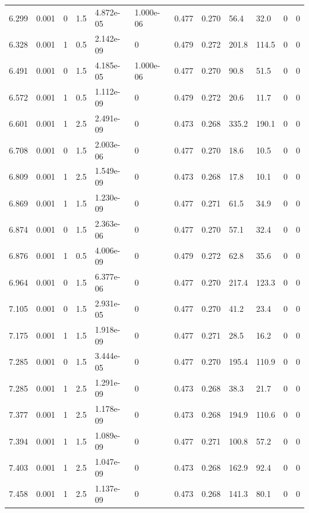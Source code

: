\documentclass[preview]{standalone}
\begin{document}
{{{\begin{tabular}{L{1.2cm}C{1.2cm} C{0.3cm}C{0.5cm} C{1.4cm}C{1.4cm} C{1.4cm}C{1.4cm} C{1.6cm}C{1.6cm} C{1.6cm}C{1.6cm}}
  6.299  &  0.001  & 0     & 1.5 &  4.872e-05  & 1.000e-06  &  0.477&   0.270& 56.4 & 32.0   &  0 & 0  \\ 
  6.328  &  0.001  & 1     & 0.5 &  2.142e-09  & 0  &  0.479&   0.272& 201.8 & 114.5   &  0 & 0  \\ 
  6.491  &  0.001  & 0     & 1.5 &  4.185e-05  & 1.000e-06  &  0.477&   0.270& 90.8 & 51.5   &  0 & 0  \\ 
  6.572  &  0.001  & 1     & 0.5 &  1.112e-09  & 0  &  0.479&   0.272& 20.6 & 11.7   &  0 & 0  \\ 
  6.601  &  0.001  & 1     & 2.5 &  2.491e-09  & 0  &  0.473&   0.268& 335.2 & 190.1   &  0 & 0  \\ 
  6.708  &  0.001  & 0     & 1.5 &  2.003e-06  & 0  &  0.477&   0.270& 18.6 & 10.5   &  0 & 0  \\ 
  6.809  &  0.001  & 1     & 2.5 &  1.549e-09  & 0  &  0.473&   0.268& 17.8 & 10.1   &  0 & 0  \\ 
  6.869  &  0.001  & 1     & 1.5 &  1.230e-09  & 0  &  0.477&   0.271& 61.5 & 34.9   &  0 & 0  \\ 
  6.874  &  0.001  & 0     & 1.5 &  2.363e-06  & 0  &  0.477&   0.270& 57.1 & 32.4   &  0 & 0  \\ 
  6.876  &  0.001  & 1     & 0.5 &  4.006e-09  & 0  &  0.479&   0.272& 62.8 & 35.6   &  0 & 0  \\ 
  6.964  &  0.001  & 0     & 1.5 &  6.377e-06  & 0  &  0.477&   0.270& 217.4 & 123.3   &  0 & 0  \\ 
  7.105  &  0.001  & 0     & 1.5 &  2.931e-05  & 0  &  0.477&   0.270& 41.2 & 23.4   &  0 & 0  \\ 
  7.175  &  0.001  & 1     & 1.5 &  1.918e-09  & 0  &  0.477&   0.271& 28.5 & 16.2   &  0 & 0  \\ 
  7.285  &  0.001  & 0     & 1.5 &  3.444e-05  & 0  &  0.477&   0.270& 195.4 & 110.9   &  0 & 0  \\ 
  7.285  &  0.001  & 1     & 2.5 &  1.291e-09  & 0  &  0.473&   0.268& 38.3 & 21.7   &  0 & 0  \\ 
  7.377  &  0.001  & 1     & 2.5 &  1.178e-09  & 0  &  0.473&   0.268& 194.9 & 110.6   &  0 & 0  \\ 
  7.394  &  0.001  & 1     & 1.5 &  1.089e-09  & 0  &  0.477&   0.271& 100.8 & 57.2   &  0 & 0  \\ 
  7.403  &  0.001  & 1     & 2.5 &  1.047e-09  & 0  &  0.473&   0.268& 162.9 & 92.4   &  0 & 0  \\ 
  7.458  &  0.001  & 1     & 2.5 &  1.137e-09  & 0  &  0.473&   0.268& 141.3 & 80.1   &  0 & 0  \\ 

\end{tabular}}}}
\end{document}
